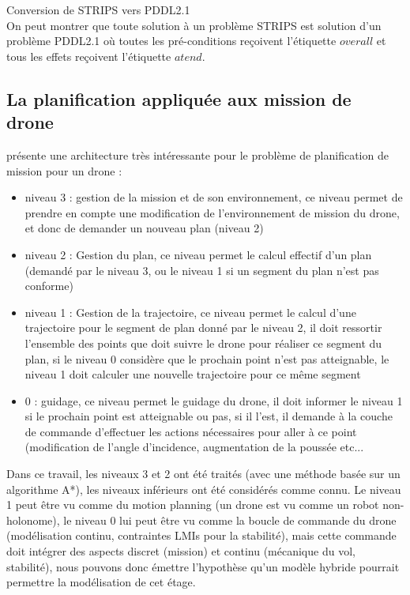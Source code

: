 \begin{theo}Conversion de STRIPS vers PDDL2.1\\
	On peut montrer que toute solution à un problème STRIPS est solution d'un problème PDDL2.1 où toutes les pré-conditions reçoivent l'étiquette $overall$ et tous les effets reçoivent l'étiquette $atend$.
\end{theo}

\subsection{La planification appliquée aux mission de drone}
\cite{chanthery_planification_2005} présente une architecture très intéressante pour le problème de planification de mission pour un drone : 
\begin{itemize}
	\item niveau 3 : gestion de la mission et de son environnement, ce niveau permet de prendre en compte une modification de l'environnement de mission du drone, et donc de demander un nouveau plan (niveau 2)
	\item niveau 2 : Gestion du plan, ce niveau permet le calcul effectif d'un plan (demandé par le niveau 3, ou le niveau 1 si un segment du plan n'est pas conforme)
	\item niveau 1 : Gestion de la trajectoire, ce niveau permet le calcul d'une trajectoire pour le segment de plan donné par le niveau 2, il doit ressortir l'ensemble des points que doit suivre le drone pour réaliser ce segment du plan, si le niveau 0 considère que le prochain point n'est pas atteignable, le niveau 1 doit calculer une nouvelle trajectoire pour ce même segment
	\item 0 : guidage, ce niveau permet le guidage du drone, il doit informer le niveau 1 si le prochain point est atteignable ou pas, si il l'est, il demande à la couche de commande d'effectuer les actions nécessaires pour aller à ce point (modification de l'angle d'incidence, augmentation de la poussée etc...
\end{itemize}
Dans ce travail, les niveaux 3 et 2 ont été traités (avec une méthode basée sur un algorithme A*), les niveaux inférieurs ont été considérés comme connu. Le niveau 1 peut être vu comme du motion planning (un drone est vu comme un robot non-holonome), le niveau 0 lui peut être vu comme la boucle de commande du drone (modélisation continu, contraintes LMIs pour la stabilité), mais cette commande doit intégrer des aspects discret (mission) et continu (mécanique du vol, stabilité), nous pouvons donc émettre l'hypothèse qu'un modèle hybride pourrait permettre la modélisation de cet étage.

